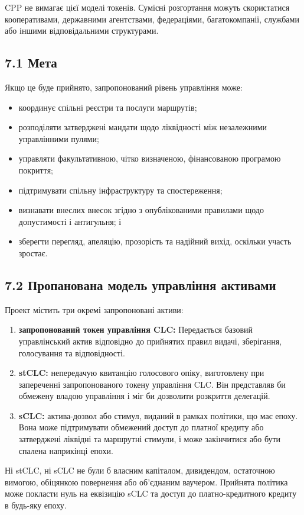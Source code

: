 \documentclass[11pt]{article}
\begin{document}
CPP не вимагає цієї моделі токенів. Сумісні розгортання можуть скористатися кооперативами, державними агентствами, федераціями, багатокомпанії, службами або іншими відповідальними структурами.

\subsection*{7.1 Мета}

Якщо це буде прийнято, запропонований рівень управління може:

\begin{itemize}[leftmargin=*]
\item координує спільні реєстри та послуги маршрутів;
\item розподіляти затверджені мандати щодо ліквідності між незалежними управлінними пулями;
\item управляти факультативною, чітко визначеною, фінансованою програмою покриття;
\item підтримувати спільну інфраструктуру та спостереження;
\item визнавати внеслих внесок згідно з опублікованими правилами щодо допустимості і антигульня; і
\item зберегти перегляд, апеляцію, прозорість та надійний вихід, оскільки участь зростає.
\end{itemize}
\subsection*{7.2 Пропанована модель управління активами}

Проект містить три окремі запропоновані активи:

\begin{enumerate}[leftmargin=*]
\item \textbf{запропонований токен управління CLC:} Передається базовий управлінський актив відповідно до прийнятих правил видачі, зберігання, голосування та відповідності.
\item \textbf{stCLC:} непередачую квитанцію голосового опіку, виготовлену при запереченні запропонованого токену управління CLC. Він представляв би обмежену владою управління і міг би дозволити розкриття делегацій.
\item \textbf{sCLC:} актива-дозвол або стимул, виданий в рамках політики, що має епоху. Вона може підтримувати обмежений доступ до платної кредиту або затверджені ліквідні та маршрутні стимули, і може закінчитися або бути спалена наприкінці епохи.
\end{enumerate}
Ні stCLC, ні sCLC не були б власним капіталом, дивидендом, остаточною вимогою, обіцянкою повернення або об'єднаним ваучером. Прийнята політика може покласти нуль на еквізицію sCLC та доступ до платно-кредитного кредиту в будь-яку епоху.
\end{document}
